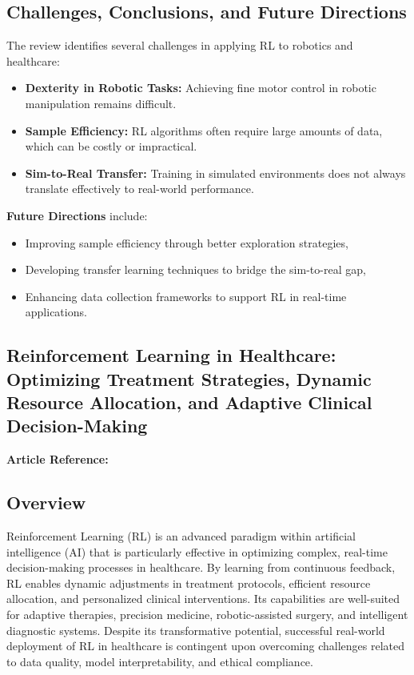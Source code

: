 \subsection*{Challenges, Conclusions, and Future Directions}
The review identifies several challenges in applying RL to robotics and healthcare:
\begin{itemize}
    \item \textbf{Dexterity in Robotic Tasks:} Achieving fine motor control in robotic manipulation remains difficult.
    \item \textbf{Sample Efficiency:} RL algorithms often require large amounts of data, which can be costly or impractical.
    \item \textbf{Sim-to-Real Transfer:} Training in simulated environments does not always translate effectively to real-world performance.
\end{itemize}

\noindent\textbf{Future Directions} include:
\begin{itemize}
    \item Improving sample efficiency through better exploration strategies,
    \item Developing transfer learning techniques to bridge the sim-to-real gap,
    \item Enhancing data collection frameworks to support RL in real-time applications.
\end{itemize}
\newpage

\subsection{Reinforcement Learning in Healthcare: Optimizing Treatment Strategies, Dynamic Resource Allocation, and Adaptive Clinical Decision-Making}
\textbf{Article Reference:} \cite{article_3}

\subsection*{Overview}
Reinforcement Learning (RL) is an advanced paradigm within artificial intelligence (AI) that is particularly effective in optimizing complex, real-time decision-making processes in healthcare. By learning from continuous feedback, RL enables dynamic adjustments in treatment protocols, efficient resource allocation, and personalized clinical interventions. Its capabilities are well-suited for adaptive therapies, precision medicine, robotic-assisted surgery, and intelligent diagnostic systems. Despite its transformative potential, successful real-world deployment of RL in healthcare is contingent upon overcoming challenges related to data quality, model interpretability, and ethical compliance.

